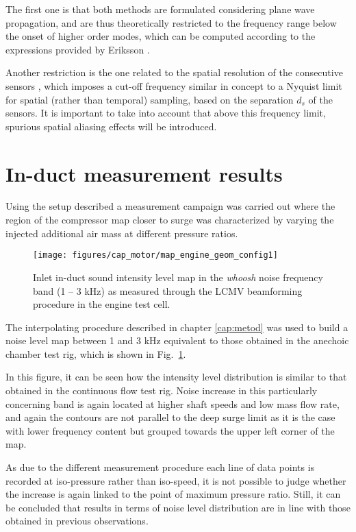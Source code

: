 The first one is that both methods are formulated considering plane wave propagation, and are thus theoretically restricted to the frequency range below the onset of higher order modes, which can be computed according to the expressions provided by Eriksson \cite{eriksson1980higher}.

Another restriction is the one related to the spatial resolution of the consecutive sensors \cite{seybert1988two}, which imposes a cut-off frequency similar in concept to a Nyquist limit for spatial (rather than temporal) sampling, based on the separation $d_s$ of the sensors. It is important to take into account that above this frequency limit, spurious spatial aliasing effects will be introduced.

\section{In-duct measurement results}

Using the setup described a measurement campaign was carried out where the region of the compressor map closer to surge was characterized by varying the injected additional air mass at different pressure ratios.

\begin{figure}[b!]
\centering
\vspace{-5mm}
\texttt{[image: figures/cap\_motor/map\_engine\_geom\_config1]}
\vspace{-5mm}
\caption{Inlet in-duct sound intensity level map in the \emph{whoosh} noise frequency band (1 -- 3 kHz) as measured through the LCMV beamforming procedure in the engine test cell.}
\label{fig:mot_map_engine_geom_config1}
\end{figure}

The interpolating procedure described in chapter \ref{cap:metod} was used to build a noise level map between 1 and 3 kHz equivalent to those obtained in the anechoic chamber test rig, which is shown in Fig.~\ref{fig:mot_map_engine_geom_config1}.

In this figure, it can be seen how the intensity level distribution is similar to that obtained in the continuous flow test rig. Noise increase in this particularly concerning band is again located at higher shaft speeds and low mass flow rate, and again the contours are not parallel to the deep surge limit as it is the case with lower frequency content but grouped towards the upper left corner of the map.

As due to the different measurement procedure each line of data points is recorded at iso-pressure rather than iso-speed, it is not possible to judge whether the increase is again linked to the point of maximum pressure ratio. Still, it can be concluded that results in terms of noise level distribution are in line with those obtained in previous observations.

